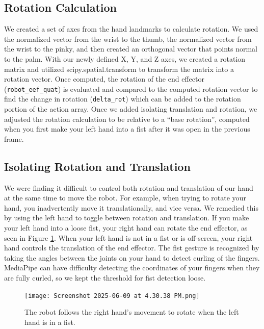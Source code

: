 \documentclass{article}
\begin{document}
\subsection{Rotation Calculation}
We created a set of axes from the hand landmarks to calculate rotation. We used the normalized vector from the wrist to the thumb, the normalized vector from the wrist to the pinky, and then created an orthogonal vector that points normal to the palm. With our newly defined X, Y, and Z axes, we created a rotation matrix and utilized scipy.spatial.transform to transform the matrix into a rotation vector. Once computed, the rotation of the end effector (\texttt{robot\_eef\_quat}) is evaluated and compared to the computed rotation vector to find the change in rotation (\texttt{delta\_rot}) which can be added to the rotation portion of the action array. Once we added isolating translation and rotation, we adjusted the rotation calculation to be relative to a “base rotation”, computed when you first make your left hand into a fist after it was open in the previous frame. 

\subsection{Isolating Rotation and Translation}
We were finding it difficult to control both rotation and translation of our hand at the same time to move the robot. For example, when trying to rotate your hand, you inadvertently move it translationally, and vice versa. We remedied this by using the left hand to toggle between rotation and translation. If you make your left hand into a loose fist, your right hand can rotate the end effector, as seen in Figure \ref{fig:fist-rotation}. When your left hand is not in a fist or is off-screen, your right hand controls the translation of the end effector. The fist gesture is recognized by taking the angles between the joints on your hand to detect curling of the fingers. MediaPipe can have difficulty detecting the coordinates of your fingers when they are fully curled, so we kept the threshold for fist detection loose. 
\begin{figure}[H]
  \centering
  \texttt{[image: Screenshot 2025-06-09 at 4.30.38 PM.png]}
  \caption{The robot follows the right hand's movement to rotate when the left hand is in a fist. }
  \label{fig:fist-rotation}
\end{figure}

\end{document}
